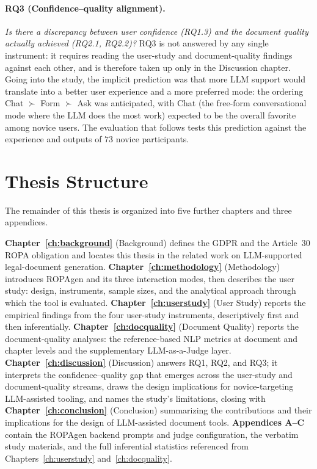 \paragraph{RQ3 (Confidence--quality alignment).} \emph{Is there a discrepancy between user confidence (RQ1.3) and the document quality actually achieved (RQ2.1, RQ2.2)?} RQ3 is not answered by any single instrument: it requires reading the user-study and document-quality findings against each other, and is therefore taken up only in the Discussion chapter.
Going into the study, the implicit prediction was that more LLM support would translate into a better user experience and a more preferred mode:
the ordering Chat $\succ$ Form $\succ$ Ask was anticipated, with Chat (the free-form conversational mode where the LLM does the most work)
expected to be the overall favorite among novice users.
The evaluation that follows tests this prediction against the experience and outputs of $73$ novice participants.

\section{Thesis Structure}
\label{sec:thesis-structure}

The remainder of this thesis is organized into five further
chapters and three appendices.

\textbf{Chapter~\ref{ch:background}} (Background) defines the GDPR
and the Article~30 ROPA obligation and locates this thesis in the
related work on LLM-supported legal-document generation.
\textbf{Chapter~\ref{ch:methodology}} (Methodology) introduces
ROPAgen and its three interaction modes, then describes the user
study: design, instruments, sample sizes, and the analytical
approach through which the tool is evaluated.
\textbf{Chapter~\ref{ch:userstudy}} (User Study) reports the
empirical findings from the four user-study instruments,
descriptively first and then inferentially.
\textbf{Chapter~\ref{ch:docquality}} (Document Quality) reports
the document-quality analyses: the reference-based NLP metrics at
document and chapter levels and the supplementary LLM-as-a-Judge
layer.
\textbf{Chapter~\ref{ch:discussion}} (Discussion) answers RQ1,
RQ2, and RQ3; it interprets the
confidence--quality gap that emerges across the user-study and
document-quality streams, draws the design implications for
novice-targeting LLM-assisted tooling, and names the study's
limitations, closing with \textbf{Chapter~\ref{ch:conclusion}} (Conclusion) summarizing
the contributions and their implications for the design of LLM-assisted document tools.
\textbf{Appendices A--C} contain the ROPAgen backend prompts and
judge configuration, the verbatim study materials, and the full
inferential statistics referenced from
Chapters~\ref{ch:userstudy} and~\ref{ch:docquality}.
